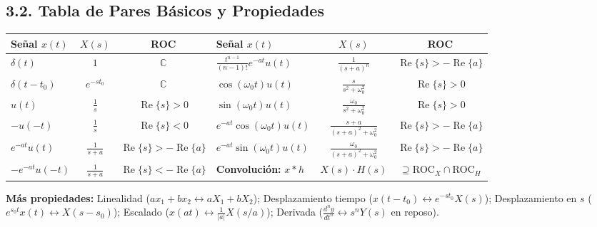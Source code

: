 \documentclass[10pt,a4paper]{article}
\begin{document}
	\subsection*{3.2. Tabla de Pares Básicos y Propiedades}
	\begin{center}
		\begin{tabular}{|l|c|c||l|c|c|}
			\hline
			\textbf{Señal $x(t)$} & \textbf{$X(s)$} & \textbf{ROC} & \textbf{Señal $x(t)$} & \textbf{$X(s)$} & \textbf{ROC} \\
			\hline
			$\delta(t)$ & $1$ & $\mathbb{C}$ & $\frac{t^{n-1}}{(n-1)!}e^{-at}u(t)$ & $\frac{1}{(s+a)^n}$ & $\operatorname{Re}\{s\} > -\operatorname{Re}\{a\}$ \\
			$\delta(t-t_0)$ & $e^{-st_0}$ & $\mathbb{C}$ & $\cos(\omega_0 t)u(t)$ & $\frac{s}{s^2+\omega_0^2}$ & $\operatorname{Re}\{s\} > 0$ \\
			$u(t)$ & $\frac{1}{s}$ & $\operatorname{Re}\{s\} > 0$ & $\sin(\omega_0 t)u(t)$ & $\frac{\omega_0}{s^2+\omega_0^2}$ & $\operatorname{Re}\{s\} > 0$ \\
			$-u(-t)$ & $\frac{1}{s}$ & $\operatorname{Re}\{s\} < 0$ & $e^{-at}\cos(\omega_0 t)u(t)$ & $\frac{s+a}{(s+a)^2+\omega_0^2}$ & $\operatorname{Re}\{s\} > -\operatorname{Re}\{a\}$ \\
			$e^{-at}u(t)$ & $\frac{1}{s+a}$ & $\operatorname{Re}\{s\} > -\operatorname{Re}\{a\}$ & $e^{-at}\sin(\omega_0 t)u(t)$ & $\frac{\omega_0}{(s+a)^2+\omega_0^2}$ & $\operatorname{Re}\{s\} > -\operatorname{Re}\{a\}$ \\
			$-e^{-at}u(-t)$ & $\frac{1}{s+a}$ & $\operatorname{Re}\{s\} < -\operatorname{Re}\{a\}$ & \textbf{Convolución:} $x*h$ & $X(s)\cdot H(s)$ & $\supseteq \text{ROC}_X \cap \text{ROC}_H$ \\
			\hline
		\end{tabular}
	\end{center}
	\textbf{Más propiedades:} Linealidad ($ax_1+bx_2 \leftrightarrow aX_1+bX_2$); Desplazamiento tiempo ($x(t-t_0) \leftrightarrow e^{-st_0}X(s)$); Desplazamiento en $s$ ($e^{s_0 t}x(t) \leftrightarrow X(s-s_0)$); Escalado ($x(at) \leftrightarrow \frac{1}{|a|}X(s/a)$); Derivada ($\frac{d^n y}{dt^n} \leftrightarrow s^n Y(s)$ en reposo).
	
\end{document}
